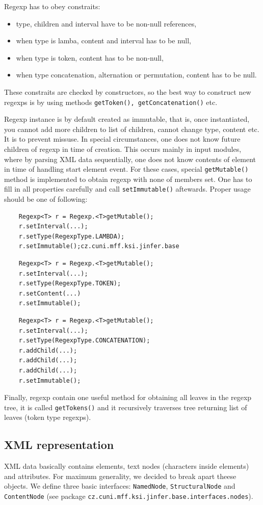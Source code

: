 \documentclass[a4paper,10pt,oneside]{article}
\newcommand{\code}[1]{\texttt{#1}}
\begin{document}
Regexp has to obey constraits:
\begin{itemize}
	\item type, children and interval have to be non-null references,
	\item when type is lamba, content and interval has to be null,
	\item when type is token, content has to be non-null,
	\item when type concatenation, alternation or permutation, content has to be null.
\end{itemize}
These constraits are checked by constructors, so the best way to construct new regexps is by using 
methods \code{getToken(), getConcatenation()} etc.

Regexp instance is by default created as immutable, that is, once instantiated, you cannot add more children to list of children, cannot change type, content etc. It is to prevent missuse. In special circumstances, one does not know future children of regexp in time of creation. This occurs mainly in input modules, where by parsing XML data sequentially, one does not know contents of element in time of handling start element event.
For these cases, special \code{getMutable()} method is implemented to obtain regexp with none of members set. One has to fill in all properties carefully and call \code{setImmutable()} aftewards. Proper usage should be one of following:
\begin{verbatim}
	Regexp<T> r = Regexp.<T>getMutable();
	r.setInterval(...);
	r.setType(RegexpType.LAMBDA);
	r.setImmutable();cz.cuni.mff.ksi.jinfer.base
\end{verbatim}
\begin{verbatim}
	Regexp<T> r = Regexp.<T>getMutable();
	r.setInterval(...);
	r.setType(RegexpType.TOKEN);
	r.setContent(...)
	r.setImmutable();
\end{verbatim}
\begin{verbatim}
	Regexp<T> r = Regexp.<T>getMutable();
	r.setInterval(...);
	r.setType(RegexpType.CONCATENATION);
	r.addChild(...);
	r.addChild(...);
	r.addChild(...);
	r.setImmutable();
\end{verbatim}
	
Finally, regexp contain one useful method for obtaining all leaves in the regexp tree, it is called \code{getTokens()} and it recursively traverses tree returning list of leaves (token type regexps).

\subsection{XML representation}
XML data basically contains elements, text nodes (characters inside elements) and attributes.
For maximum generality, we decided to break apart theese objects.
We define three basic interfaces: \code{NamedNode}, \code{StructuralNode} and \code{ContentNode} (see package \code{cz.cuni.mff.ksi.jinfer.base.interfaces.nodes}). 
\end{document}
